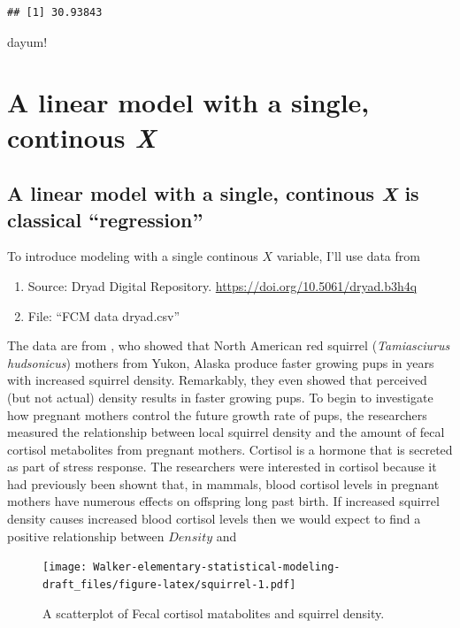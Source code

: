\documentclass[]{book}
\providecommand{\tightlist}{%
  \setlength{\itemsep}{0pt}\setlength{\parskip}{0pt}}
\theoremstyle{definition}
\theoremstyle{definition}
\theoremstyle{definition}
\theoremstyle{remark}
\begin{document}
\begin{verbatim}
## [1] 30.93843
\end{verbatim}

dayum!

\chapter{\texorpdfstring{A linear model with a single, continous
\emph{X}}{A linear model with a single, continous X}}\label{a-linear-model-with-a-single-continous-x}

\section{\texorpdfstring{A linear model with a single, continous
\emph{X} is classical
``regression''}{A linear model with a single, continous X is classical regression}}\label{a-linear-model-with-a-single-continous-x-is-classical-regression}

To introduce modeling with a single continous \(X\) variable, I'll use
data from

\begin{enumerate}
\def\labelenumi{\arabic{enumi}.}
\tightlist
\item
  Source: Dryad Digital Repository.
  \url{https://doi.org/10.5061/dryad.b3h4q}
\item
  File: ``FCM data dryad.csv''
\end{enumerate}

The data are from \citet{Dantzer_xxx}, who showed that North American
red squirrel (\emph{Tamiasciurus hudsonicus}) mothers from Yukon, Alaska
produce faster growing pups in years with increased squirrel density.
Remarkably, they even showed that perceived (but not actual) density
results in faster growing pups. To begin to investigate how pregnant
mothers control the future growth rate of pups, the researchers measured
the relationship between local squirrel density and the amount of fecal
cortisol metabolites from pregnant mothers. Cortisol is a hormone that
is secreted as part of stress response. The researchers were interested
in cortisol because it had previously been shownt that, in mammals,
blood cortisol levels in pregnant mothers have numerous effects on
offspring long past birth. If increased squirrel density causes
increased blood cortisol levels then we would expect to find a positive
relationship between \(Density\) and

\begin{figure}
\centering
\texttt{[image: Walker-elementary-statistical-modeling-draft\_files/figure-latex/squirrel-1.pdf]}
\caption{\label{fig:squirrel}A scatterplot of Fecal cortisol matabolites and
squirrel density.}
\end{figure}
\end{document}
